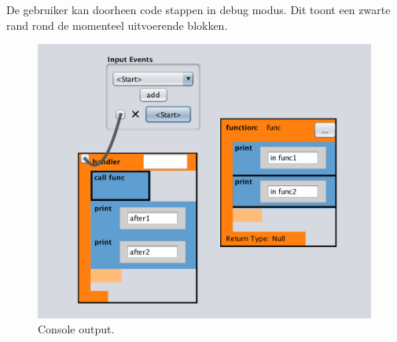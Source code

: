 \documentclass[]{article}
\begin{document}
De gebruiker kan doorheen code stappen in debug modus. Dit toont een zwarte rand rond de momenteel uitvoerende blokken.
\begin{figure}[H]
  \centering
\includegraphics[scale=0.65]{Documentatie/images/debug}
  \caption{Console output.} 
  \label{debugdoc}
\end{figure}
\end{document}
